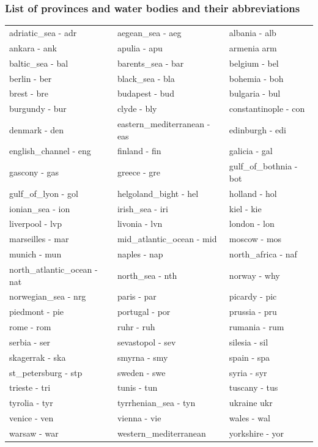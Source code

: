 \documentclass[11pt,a4paper]{report}
\begin{document}
\subsubsection*{List of provinces and water bodies and their abbreviations}
\begin{tabular}{ l | l | l }
adriatic\_sea - adr & aegean\_sea - aeg & albania - alb \\
ankara - ank & apulia - apu & armenia arm \\
baltic\_sea - bal & barents\_sea - bar & belgium - bel \\
berlin - ber & black\_sea - bla & bohemia - boh \\
brest - bre & budapest - bud & bulgaria - bul \\
burgundy - bur & clyde - bly & constantinople - con \\
denmark - den & eastern\_mediterranean - eas & edinburgh - edi \\
english\_channel - eng & finland - fin & galicia - gal \\
gascony - gas & greece - gre & gulf\_of\_bothnia - bot \\
gulf\_of\_lyon - gol & helgoland\_bight - hel & holland - hol \\
ionian\_sea - ion & irish\_sea - iri & kiel - kie \\
liverpool - lvp & livonia - lvn & london - lon \\
marseilles - mar & mid\_atlantic\_ocean - mid & moscow - mos \\
munich - mun & naples - nap & north\_africa - naf \\
north\_atlantic\_ocean - nat & north\_sea - nth & norway - why \\
norwegian\_sea - nrg & paris - par & picardy - pic \\
piedmont - pie & portugal - por & prussia - pru \\
rome - rom & ruhr - ruh & rumania - rum \\
serbia - ser & sevastopol - sev & silesia - sil \\
skagerrak - ska & smyrna - smy & spain - spa \\
st\_petersburg - stp & sweden - swe & syria - syr \\
trieste - tri & tunis - tun & tuscany - tus \\
tyrolia - tyr & tyrrhenian\_sea - tyn & ukraine ukr \\
venice - ven & vienna - vie & wales - wal \\
warsaw - war & western\_mediterranean & yorkshire - yor \\
\end{tabular}
\end{document}
